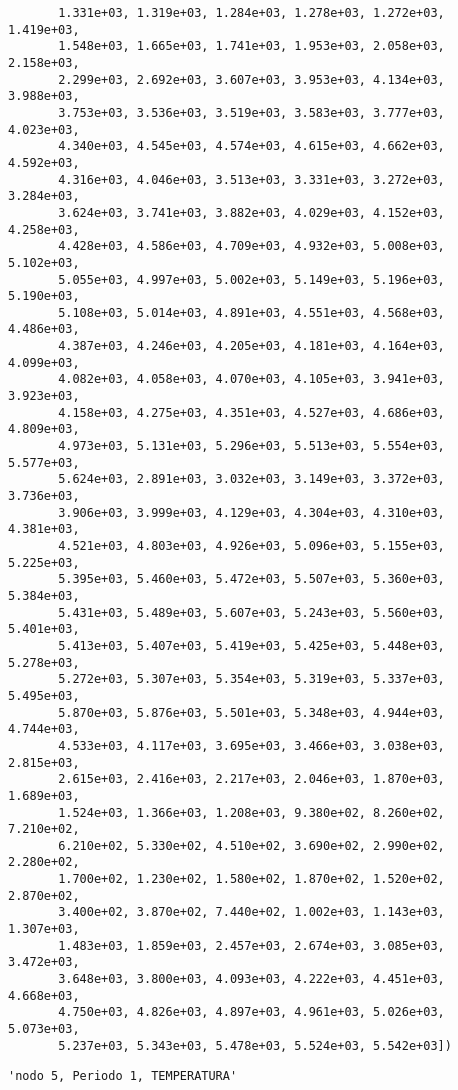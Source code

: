 \documentclass[11pt]{article}
\begin{document}
\begin{verbatim}
       1.331e+03, 1.319e+03, 1.284e+03, 1.278e+03, 1.272e+03, 1.419e+03,
       1.548e+03, 1.665e+03, 1.741e+03, 1.953e+03, 2.058e+03, 2.158e+03,
       2.299e+03, 2.692e+03, 3.607e+03, 3.953e+03, 4.134e+03, 3.988e+03,
       3.753e+03, 3.536e+03, 3.519e+03, 3.583e+03, 3.777e+03, 4.023e+03,
       4.340e+03, 4.545e+03, 4.574e+03, 4.615e+03, 4.662e+03, 4.592e+03,
       4.316e+03, 4.046e+03, 3.513e+03, 3.331e+03, 3.272e+03, 3.284e+03,
       3.624e+03, 3.741e+03, 3.882e+03, 4.029e+03, 4.152e+03, 4.258e+03,
       4.428e+03, 4.586e+03, 4.709e+03, 4.932e+03, 5.008e+03, 5.102e+03,
       5.055e+03, 4.997e+03, 5.002e+03, 5.149e+03, 5.196e+03, 5.190e+03,
       5.108e+03, 5.014e+03, 4.891e+03, 4.551e+03, 4.568e+03, 4.486e+03,
       4.387e+03, 4.246e+03, 4.205e+03, 4.181e+03, 4.164e+03, 4.099e+03,
       4.082e+03, 4.058e+03, 4.070e+03, 4.105e+03, 3.941e+03, 3.923e+03,
       4.158e+03, 4.275e+03, 4.351e+03, 4.527e+03, 4.686e+03, 4.809e+03,
       4.973e+03, 5.131e+03, 5.296e+03, 5.513e+03, 5.554e+03, 5.577e+03,
       5.624e+03, 2.891e+03, 3.032e+03, 3.149e+03, 3.372e+03, 3.736e+03,
       3.906e+03, 3.999e+03, 4.129e+03, 4.304e+03, 4.310e+03, 4.381e+03,
       4.521e+03, 4.803e+03, 4.926e+03, 5.096e+03, 5.155e+03, 5.225e+03,
       5.395e+03, 5.460e+03, 5.472e+03, 5.507e+03, 5.360e+03, 5.384e+03,
       5.431e+03, 5.489e+03, 5.607e+03, 5.243e+03, 5.560e+03, 5.401e+03,
       5.413e+03, 5.407e+03, 5.419e+03, 5.425e+03, 5.448e+03, 5.278e+03,
       5.272e+03, 5.307e+03, 5.354e+03, 5.319e+03, 5.337e+03, 5.495e+03,
       5.870e+03, 5.876e+03, 5.501e+03, 5.348e+03, 4.944e+03, 4.744e+03,
       4.533e+03, 4.117e+03, 3.695e+03, 3.466e+03, 3.038e+03, 2.815e+03,
       2.615e+03, 2.416e+03, 2.217e+03, 2.046e+03, 1.870e+03, 1.689e+03,
       1.524e+03, 1.366e+03, 1.208e+03, 9.380e+02, 8.260e+02, 7.210e+02,
       6.210e+02, 5.330e+02, 4.510e+02, 3.690e+02, 2.990e+02, 2.280e+02,
       1.700e+02, 1.230e+02, 1.580e+02, 1.870e+02, 1.520e+02, 2.870e+02,
       3.400e+02, 3.870e+02, 7.440e+02, 1.002e+03, 1.143e+03, 1.307e+03,
       1.483e+03, 1.859e+03, 2.457e+03, 2.674e+03, 3.085e+03, 3.472e+03,
       3.648e+03, 3.800e+03, 4.093e+03, 4.222e+03, 4.451e+03, 4.668e+03,
       4.750e+03, 4.826e+03, 4.897e+03, 4.961e+03, 5.026e+03, 5.073e+03,
       5.237e+03, 5.343e+03, 5.478e+03, 5.524e+03, 5.542e+03])
    \end{verbatim}

    
    
    \begin{verbatim}
'nodo 5, Periodo 1, TEMPERATURA'
    \end{verbatim}
\end{document}
